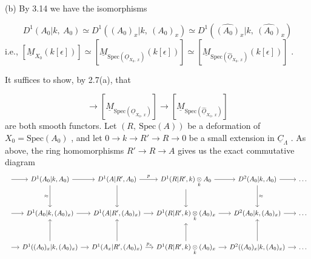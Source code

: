 (b)  By 3.14 we have the isomorphisms

\begin{equation*}
D^1(A_0|k,\ A_0) \simeq D^1((A_0)_x|k,\ (A_0)_x) \simeq D^1(\widehat{(A_0)}_x|k,\ \widehat{(A_0)}_x)
\end{equation*}
i.e.,   $[\underline{M}_{X_0}(k[\epsilon])] \simeq [\underline{M}_{\mathrm{Spec}(\underline{O}_{X_0,\ x})}(k[\epsilon])] \simeq [\underline{M}_{\mathrm{Spec}(\widehat{\underline{O}}_{X_0,\ x})}(k[\epsilon])]$ .

It suffices to show, by 2.7(a), that

\begin{equation*}
[\underline{M}_{X_0}] \to [\underline{M}_{\mathrm{Spec}(\underline{O}_{X_0,\ x})}] \to [\underline{M}_{\mathrm{Spec}(\widehat{\underline{O}}_{X_0,\ x})}]
\end{equation*}
are both smooth functors. Let  $(R,\ \mathrm{Spec}(A))$  be a deformation of  $X_0 = \mathrm{Spec}(A_0)$  , and let  $0 \to k \to R' \to R \to 0$  be a small extension in  $\underline{C}_{\Lambda}$  . As above, the ring homomorphisms  $R' \to R \to A$  gives us the exact commutative diagram
{\small
\[
\begin{tikzcd}[column sep=small, row sep=large]
{} \arrow[r] & D^1(A_0|k,A_0) \arrow[r] \arrow[d, "\approx"'] & D^1(A|R',A_0) \arrow[r, "p"] \arrow[d] & D^1(R|R',k)\underset{k}{\otimes}A_0 \arrow[r] \arrow[d] & D^2(A_0|k,A_0) \arrow[r] \arrow[d, "\approx"] & \dots \\
{} \arrow[r] & D^1(A_0|k,(A_0)_x) \arrow[r] & D^1(A|R',(A_0)_x) \arrow[r] & D^1(R|R',k)\underset{k}{\otimes}(A_0)_x \arrow[r] & D^2(A_0|k,(A_0)_x) \arrow[r] & \dots \\
{} \arrow[r] & D^1((A_0)_x|k,(A_0)_x) \arrow[r] \arrow[u] & D^1(A_x|R',(A_0)_x) \arrow[r, "p_x"] \arrow[u] & D^1(R|R',k)\underset{k}{\otimes}(A_0)_x \arrow[r] \arrow[u] & D^2((A_0)_x|k,(A_0)_x) \arrow[r] \arrow[u] & \dots
\end{tikzcd}
\]}
